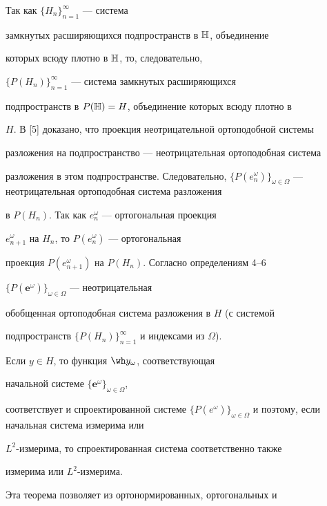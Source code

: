 \begin{pf}


Так как $\{H_n\}_{n=1}^\infty$ --- система


замкнутых расширяющихся подпространств в $\Bbb H$, объединение


которых всюду плотно в $\Bbb H$, то, следовательно,


$\{P(H_n)\}_{n=1}^\infty$ --- система замкнутых расширяющихся


подпространств в $P(\Bbb H)=H$, объединение которых всюду плотно в


$H$. В [5] доказано, что проекция неотрицательной ортоподобной системы


разложения на подпространство --- неотрицательная ортоподобная система


разложения в этом подпространстве. Следовательно, $\{P(e^\omega_n)\}_{


\omega\in\Omega}$ --- неотрицательная ортоподобная система разложения


в $P(H_n)$. Так как $e^\omega_n$ --- ортогональная проекция


$e^\omega_{n+1}$ на $H_n$, то $P(e^\omega_n)$ --- ортогональная


проекция $P(e^\omega_{n+1})$ на $P(H_n)$. Согласно определениям 4--6


$\{P(\boldsymbol e^\omega)\}_{\omega\in\Omega}$ --- неотрицательная


обобщенная ортоподобная система разложения в $H$ (с системой


подпространств $\{P(H_n)\}_{n=1}^\infty$ и индексами из $\Omega$).





Если $y\in H$, то функция $\wh y_\omega$, соответствующая


начальной системе $\{\boldsymbol e^\omega\}_{\omega\in\Omega}$,


соответствует и спроектированной системе $\{P(e^\omega)\}_{\omega\in


\Omega}$ и поэтому, если начальная система измерима или


$L^2$-измерима, то спроектированная система соответственно также


измерима или $L^2$-измерима.


\end{pf}





Эта теорема позволяет из ортонормированных, ортогональных и


